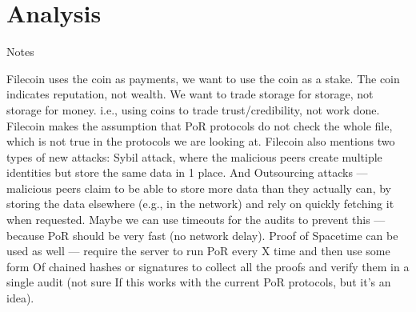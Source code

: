\label{chapter:analysis}
\chapter{Analysis}






Notes

Filecoin uses the coin as payments, we want to use the coin as a stake.
The coin indicates reputation, not wealth.
We want to trade storage for storage, not storage for money.
i.e., using coins to trade trust/credibility, not work done.
Filecoin makes the assumption that PoR protocols do not check the whole file,
which is not true in the protocols we are looking at.
Filecoin also mentions two types of new attacks:
Sybil attack, where the malicious peers create multiple identities but store the same data in 1 place.
And Outsourcing attacks --- malicious peers claim to be able to store more data than they actually can,
by storing the data elsewhere (e.g., in the network) and rely on quickly fetching it when requested.
Maybe we can use timeouts for the audits to prevent this --- because PoR should be very fast (no network delay).
Proof of Spacetime can be used as well --- require the server to run PoR every X time and then use some form Of
chained hashes or signatures to collect all the proofs and verify them in a single audit (not sure If
this works with the current PoR protocols, but it's an idea).
